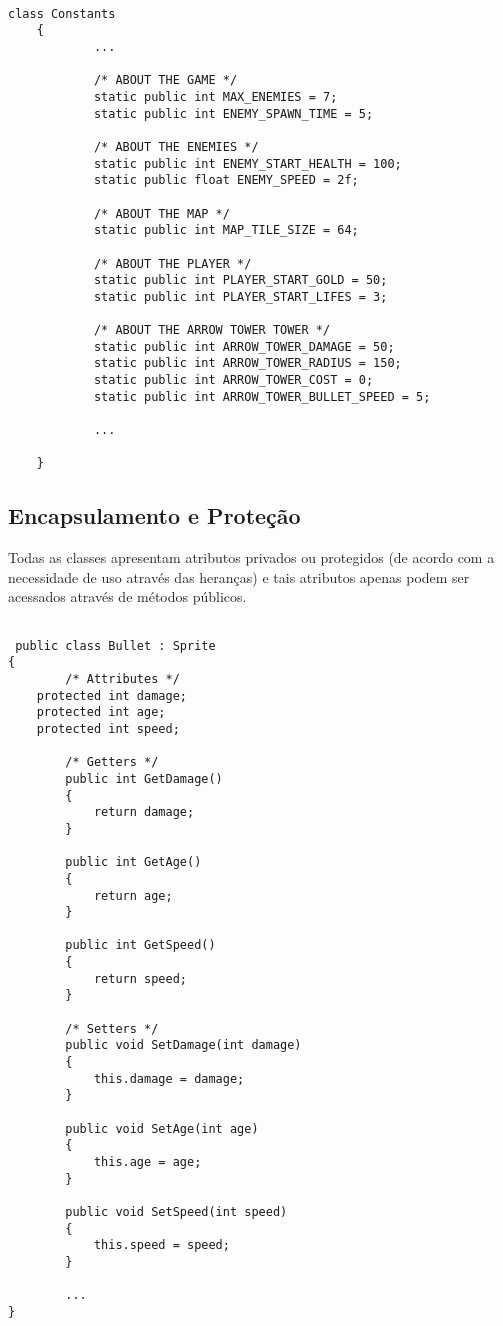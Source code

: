 \documentclass[rel_mlp]{iiufrgs}
\begin{document}
\begin{lstlisting}[caption=Trecho de código C\# retirado da implementação deste trabalho, label=lst:test]

class Constants
	{
			...
			
			/* ABOUT THE GAME */
			static public int MAX_ENEMIES = 7;
			static public int ENEMY_SPAWN_TIME = 5;

			/* ABOUT THE ENEMIES */
			static public int ENEMY_START_HEALTH = 100;
			static public float ENEMY_SPEED = 2f;

			/* ABOUT THE MAP */
			static public int MAP_TILE_SIZE = 64;

			/* ABOUT THE PLAYER */
			static public int PLAYER_START_GOLD = 50;
			static public int PLAYER_START_LIFES = 3;

			/* ABOUT THE ARROW TOWER TOWER */
			static public int ARROW_TOWER_DAMAGE = 50;
			static public int ARROW_TOWER_RADIUS = 150;
			static public int ARROW_TOWER_COST = 0;
			static public int ARROW_TOWER_BULLET_SPEED = 5;
			
			...
			
	}

\end{lstlisting}

\subsection{Encapsulamento e Proteção}

Todas as classes apresentam atributos privados ou protegidos (de acordo com a necessidade de uso através das heranças) e tais atributos apenas podem ser acessados através de métodos públicos.

\begin{lstlisting}[caption=Trecho de código C\# retirado da implementação deste trabalho, label=lst:test]

 public class Bullet : Sprite
{
		/* Attributes */
    protected int damage;
    protected int age;
    protected int speed;

		/* Getters */
		public int GetDamage()
		{
			return damage;
		}

		public int GetAge()
		{
			return age;
		}

		public int GetSpeed()
		{
			return speed;
		}

		/* Setters */
		public void SetDamage(int damage)
		{
			this.damage = damage;
		}

		public void SetAge(int age)
		{
			this.age = age;
		}

		public void SetSpeed(int speed)
		{
			this.speed = speed;
		}
		
		...
}

\end{lstlisting}
\end{document}

